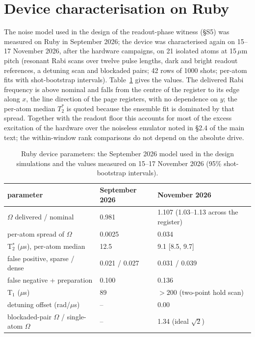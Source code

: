 \documentclass[11pt,a4paper]{article}
\begin{document}
\section{Device characterisation on Ruby}
\label{sec:si_device}
The noise model used in the design of the readout-phase witness (\S S5) was measured on Ruby in September 2026; the device was characterised again on 15--17 November 2026, after the hardware campaigns, on 21 isolated atoms at 15\,$\mu$m pitch (resonant Rabi scans over twelve pulse lengths, dark and bright readout references, a detuning scan and blockaded pairs; 42 rows of 1000 shots; per-atom fits with shot-bootstrap intervals). Table~\ref{tab:device} gives the values. The delivered Rabi frequency is above nominal and falls from the centre of the register to its edge along $x$, the line direction of the page registers, with no dependence on $y$; the per-atom median $T_2^*$ is quoted because the ensemble fit is dominated by that spread. Together with the readout floor this accounts for most of the excess excitation of the hardware over the noiseless emulator noted in \S 2.4 of the main text; the within-window rank comparisons do not depend on the absolute drive.

\begin{table}[H]
\centering\small
\caption{Ruby device parameters: the September 2026 model used in the design simulations and the values measured on 15--17 November 2026 (95\% shot-bootstrap intervals).}
\label{tab:device}
\begin{tabular}{lll}
\hline
parameter & September 2026 & November 2026 \\
\hline
$\Omega$ delivered / nominal & 0.981 & 1.107 (1.03--1.13 across the register) \\
per-atom spread of $\Omega$ & 0.0025 & 0.034 \\
T$_2^*$ ($\mu$s), per-atom median & 12.5 & 9.1 [8.5, 9.7] \\
false positive, sparse / dense & 0.021 / 0.027 & 0.031 / 0.039 \\
false negative + preparation & 0.100 & 0.136 \\
T$_1$ ($\mu$s) & 89 & $>200$ (two-point hold scan) \\
detuning offset (rad/$\mu$s) & -- & 0.00 \\
blockaded-pair $\Omega$ / single-atom $\Omega$ & -- & 1.34 (ideal $\sqrt2$) \\
\hline
\end{tabular}
\end{table}
\end{document}
